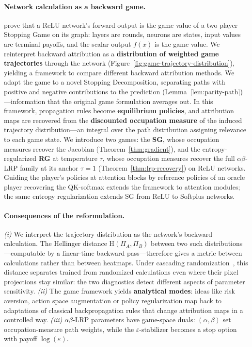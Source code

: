 \documentclass[twoside]{article}
\newif\ifch \chfalse
\newcommand{\ch}[1]{\ifch\textcolor{magenta}{#1}\else#1\fi}
\newcommand{\1}{\mathbf{1}}
\begin{document}
\paragraph{Network calculation as a backward game.}
\citet{Gaubert2025} prove that a ReLU network's forward output is the game value of a two-player
Stopping Game on its graph: layers are rounds, neurons are states, input values are terminal
payoffs, and the scalar output $f(x)$ is the game value.
We reinterpret backward attribution
as a \textbf{distribution of weighted game trajectories} through the network
\ch{(Figure~\ref{fig:game-trajectory-distribution})}, yielding a framework to compare different backward
attribution methods. We adapt the game to a novel Stopping
Decomposition, separating paths with positive and negative contributions to the prediction
(Lemma~\ref{lem:parity-path})---information that the original game formulation averages out.
\ch{In this framework,} propagation rules become \textbf{equilibrium policies}, and attribution
maps are recovered from the \textbf{discounted occupation measure} of the induced trajectory
distribution---an integral over the path distribution assigning relevance to each game state.
We introduce two games:
the \textbf{\ac{SG}}, whose occupation measures recover the Jacobian (Theorem~\ref{thm:gradient}),
and the entropy-regularized \textbf{\ac{RG}} at temperature $\tau$, whose occupation measures
recover the full $\alpha\beta$-\ac{LRP} family at its anchor $\tau{=}1$
(Theorem~\ref{thm:lrp-recovery}) on ReLU networks. Guiding the player's policies at attention
blocks by reference policies of an oracle player recovering the QK-softmax extends the framework to
attention modules; the same entropy regularization extends \ac{SG} from \ac{ReLU} to Softplus
networks.

\paragraph{Consequences of the reformulation.}

\emph{(i)} We interpret the trajectory distribution as the network's backward calculation.
The Hellinger distance $\mathrm{H}(\Pi_A,\Pi_B)$ between two such distributions---computable by a
linear-time backward pass---therefore gives a metric between calculations rather than between
heatmaps.
\ch{Under cascading randomization~\citep{Adebayo2018sanity}, this distance separates trained from
randomized calculations even where their pixel projections stay similar: the two diagnostics detect
different aspects of parameter sensitivity.}
\emph{(ii)} The game framework yields \textbf{analytical modes}: ideas like risk aversion, action
space augmentation or policy regularization map back to adaptations of classical backpropagation
rules that change attribution maps in a controlled way.
\emph{(iii)} $\alpha\beta$-\ac{LRP} parameters have game-space duals: $(\alpha,\beta)$ set
occupation-measure path weights, while the $\varepsilon$-stabilizer becomes a stop option with
payoff $\log(\varepsilon)$.
\end{document}
